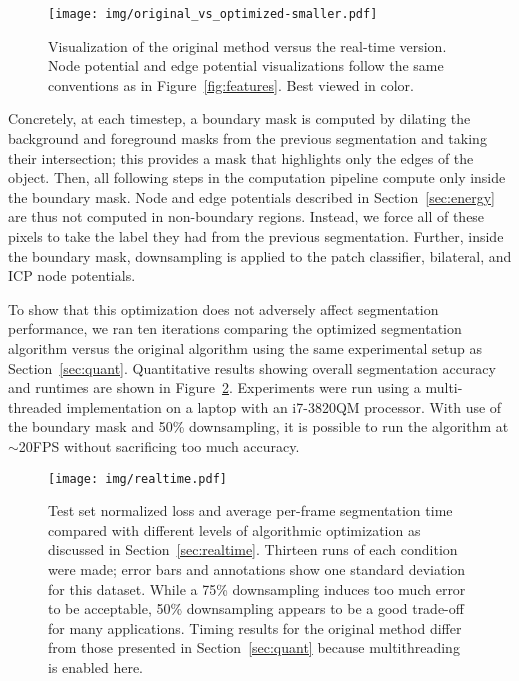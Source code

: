 \documentclass[graybox]{svmult}
\newcommand{\todoCR}[1]{\textcolor{blue}{}}
\begin{document}
\begin{figure}
  \centering
  \texttt{[image: img/original\_vs\_optimized-smaller.pdf]}
  \caption{Visualization of the original method versus the real-time version.  Node potential and edge potential visualizations follow the same conventions as in Figure~\ref{fig:features}.  Best viewed in color.}
  \label{fig:mask}
\end{figure}


Concretely, at each timestep, a boundary mask is computed by dilating the background and foreground masks from the previous segmentation and taking their intersection; this provides a mask that highlights only the edges of the object.  Then, all following steps in the computation pipeline compute only inside the boundary mask.  Node and edge potentials described in Section~\ref{sec:energy} are thus not computed in non-boundary regions.  Instead, we force all of these pixels to take the label they had from the previous segmentation. Further, inside the boundary mask, downsampling is applied to the patch classifier, bilateral, and ICP node potentials.

To show that this optimization does not adversely affect segmentation performance, we ran ten iterations comparing the optimized segmentation algorithm versus the original algorithm using the same experimental setup as Section~\ref{sec:quant}.  Quantitative results showing overall segmentation accuracy and runtimes are shown in Figure~\ref{fig:realtime}. Experiments were run using a multi-threaded implementation on a laptop with an i7-3820QM processor.  With use of the boundary mask and 50\% downsampling, it is possible to run the algorithm at $\sim$20FPS without sacrificing too much accuracy.

\pagebreak

\begin{figure}
  \centering
  \texttt{[image: img/realtime.pdf]}
  \caption{Test set normalized loss and average per-frame segmentation time compared with different levels of algorithmic optimization as discussed in Section~\ref{sec:realtime}.  Thirteen runs of each condition were made; error bars and annotations show one standard deviation for this dataset. While a 75\% downsampling induces too much error to be acceptable, 50\% downsampling appears to be a good trade-off for many applications.  Timing results for the original method differ from those presented in Section~\ref{sec:quant} because multithreading is enabled here. \todoCR{Reported stdevs should probably be for everything combined; when people think timing stdev they're going to think that's per-frame, and this plot is reporting per-full-test-run which has much lower stdev.}}
  \label{fig:realtime}
\end{figure}
\end{document}
